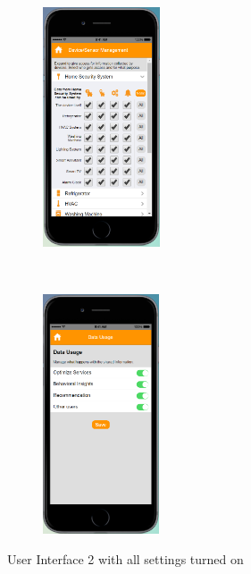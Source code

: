 \begin{appendices}
\begin{figure}
\begin{subfigure}[t]{0.19\textwidth}
	\end{subfigure}%
	~~~~~~
	\begin{subfigure}[t]{0.19\textwidth}
		\centering
		\includegraphics[height=2.8in]{figures/ui2allOn3.png}
	\end{subfigure}%
	~~~~~~
	\begin{subfigure}[t]{0.19\textwidth}
		\centering
		\includegraphics[height=2.8in]{figures/ui2allOn4.png}
	\end{subfigure}%
	\caption{User Interface 2 with all settings turned on}
	\label{fig:ui2AllOn}
\end{figure}


\end{appendices}
